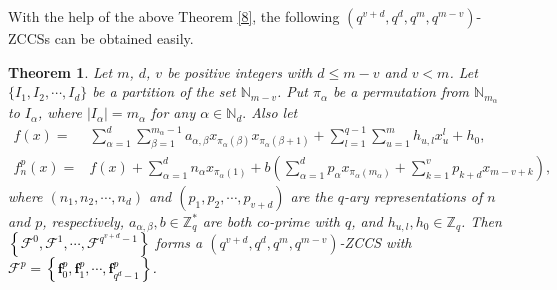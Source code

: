 \documentclass[11pt]{article}
\newcommand{\2} {$2$-to-$1$}
\newtheorem{thm}{\bfseries  Theorem}[section]
\begin{document}
With the help of the above Theorem \ref{8}, the following $(q^{v+d},q^{d},q^{m},q^{m-v})$-ZCCSs can be obtained easily.
\begin{thm} \label{4}
	Let $m$, $ d $, $ v $ be positive integers with $d\leq m-v $ and $ v<m $. Let $\{I_1, I_2,\cdots,I_d\}$  be a partition of the set $\mathbb{N}_{m-v}$. Put $ \pi_{\alpha} $ be a permutation from $\mathbb{N}_{m_{\alpha}}$ to $ I_{\alpha} $, where $ \lvert I_{\alpha}\rvert =m_{\alpha} $ for any $ \alpha\in \mathbb{N}_{d}. $ Also let 	
	\begin{align*}
		f(x)=&\sum_{\alpha=1}^{d}\sum_{\beta=1}^{m_{\alpha}-1}a_{\alpha,\beta}x_{\pi_{\alpha}(\beta)}x_{\pi_{\alpha}(\beta+1)}+\sum_{l=1}^{q-1}\sum_{u=1}^{m}h_{u,l}x^l_u+h_0,\\
		f^p_{n}(x)=&f(x)+\sum_{\alpha=1}^{d}n_{\alpha}x_{\pi_{\alpha}(1)}+b\left( \sum_{\alpha=1}^{d}p_{\alpha}x_{\pi_{\alpha}(m_{\alpha})}+\sum_{k=1}^{v}p_{k+d}x_{m-v+k}\right) ,
	\end{align*}
	where $(n_{1},n_{2},\cdots,n_{d})$ and $(p_{1},p_{2},\cdots,p_{v+d})$ are the $q$-ary representations of $n$ and $p$,  respectively,	$a_{\alpha,\beta}, b\in \mathbb{Z}^{*}_{q}$ are both co-prime with $q$, and $h_{u,l}, h_0 \in \mathbb{Z}_{q}$.    Then \textcolor{black}{$\left\lbrace \mathcal{F}^{0},\mathcal{F}^{1},\cdots,\mathcal{F}^{q^{v+d}-1}\right\rbrace $} forms a $(q^{v+d},q^{d},q^{m},q^{m-v})$-ZCCS with \textcolor{black}{$\mathcal{F}^{p}=\left\lbrace \mathbf{f}^{p}_{0},\mathbf{f}^{p}_{1},\cdots,\mathbf{f}^{p}_{q^d-1}\right\rbrace $.}
\end{thm}
\end{document}
